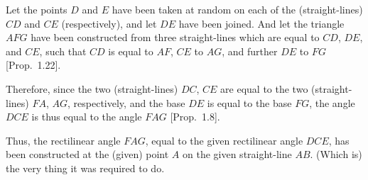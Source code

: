 \begin{Parallel}{}{}
{Let the points $D$ and $E$ have been taken at random on each
of the (straight-lines) $CD$ and $CE$ (respectively), and let $DE$ have been joined.
And let the triangle $AFG$ have been constructed from three straight-lines
which are equal to $CD$, $DE$, and $CE$, such that $CD$ is equal to $AF$,
$CE$ to $AG$, and further $DE$ to $FG$ [Prop.~1.22].

Therefore, since the two (straight-lines) $DC$, $CE$ are equal to the
two (straight-lines) $FA$, $AG$, respectively, and the base $DE$ is equal to
the base $FG$, the angle $DCE$ is thus equal to the angle $FAG$ [Prop.~1.8].

Thus, the rectilinear angle $FAG$,  equal to the  given
rectilinear angle $DCE$, has been constructed at the (given) point $A$ on the given straight-line $AB$.
(Which is) the very thing it was required to do.}
\end{Parallel}


